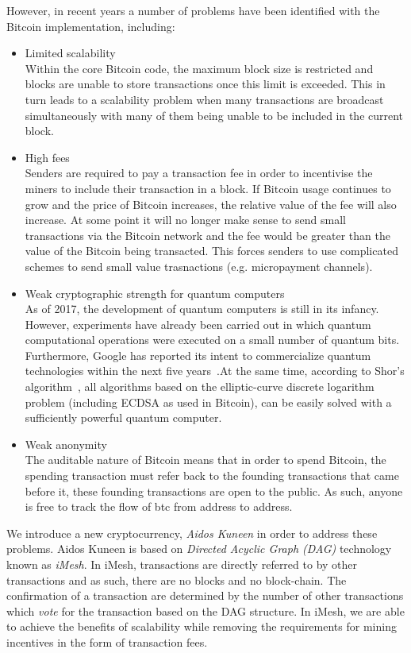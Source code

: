 \documentclass[a4paper,10pt,twocolumn]{article}
\begin{document}
However, in recent years a number of problems have been identified with the Bitcoin implementation, including:
\vspace{-0.5\baselineskip}
\begin{itemize}
	\setlength\itemsep{0em}
	\item{Limited scalability}\mbox{}\\ 
	Within the core Bitcoin code, the maximum block size is restricted and blocks are unable to store transactions once this limit 
	is exceeded. This in turn leads to a scalability problem when many transactions are broadcast simultaneously with many of them 
	being unable to be included in the current block.
	\item{High fees}\mbox{}\\ 
	Senders are required to pay a transaction fee in order to incentivise the miners to include their transaction in a block.
	If Bitcoin usage continues to grow and the price of Bitcoin increases, the relative value of the fee will also increase. At some
	point it will no longer make sense to send small transactions via the Bitcoin network and the fee would be greater than the 
	value of the Bitcoin being transacted. This forces senders to use complicated schemes to send small value trasnactions (e.g. 
	micropayment channels).
	\item{Weak cryptographic strength for quantum computers}\mbox{}\\ 
	As of 2017, the development of quantum computers is still in its infancy. However, experiments have already been carried out in 
	which quantum computational operations were executed on a small number of quantum bits. Furthermore, Google has reported its 
	intent to commercialize quantum technologies within the next five years~\cite{google}.At the same time, according to Shor's 
	algorithm~\cite{shor}, all algorithms based on the elliptic-curve discrete logarithm problem (including ECDSA as used in 
	Bitcoin), can be easily solved with a sufficiently powerful quantum computer. 
	\item{Weak anonymity}\mbox{}\\ 
	The auditable nature of Bitcoin means that in order to spend Bitcoin, the spending transaction must refer back to the founding
	transactions that came before it, these founding transactions are open to the public. As such, anyone is free to track the flow
	of btc from address to address.
\end{itemize}

We introduce a new cryptocurrency, \emph{Aidos Kuneen} in order to address these problems.
Aidos Kuneen is based on \emph{Directed Acyclic Graph (DAG)} technology known as \emph{iMesh}.
In iMesh, transactions are directly referred to by other transactions and as such, there are no blocks and no block-chain.
The confirmation of a transaction are determined by the number of other transactions which \emph{vote}
for the transaction based on the DAG structure. In iMesh, we are able to achieve the benefits of scalability while removing the 
requirements for mining incentives in the form of transaction fees.
\end{document}
